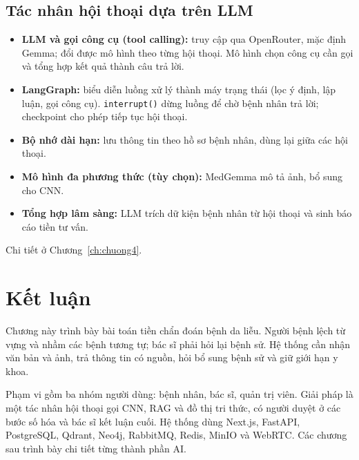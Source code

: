 \subsection{Tác nhân hội thoại dựa trên LLM}
\begin{itemize}
  \item \textbf{LLM và gọi công cụ (tool calling):} truy cập qua OpenRouter, mặc định Gemma; đổi được mô hình theo từng hội thoại. Mô hình chọn công cụ cần gọi và tổng hợp kết quả thành câu trả lời.
  \item \textbf{LangGraph:} biểu diễn luồng xử lý thành máy trạng thái (lọc ý định, lập luận, gọi công cụ). \texttt{interrupt()} dừng luồng để chờ bệnh nhân trả lời; checkpoint cho phép tiếp tục hội thoại.
  \item \textbf{Bộ nhớ dài hạn:} lưu thông tin theo hồ sơ bệnh nhân, dùng lại giữa các hội thoại.
  \item \textbf{Mô hình đa phương thức (tùy chọn):} MedGemma mô tả ảnh, bổ sung cho CNN.
  \item \textbf{Tổng hợp lâm sàng:} LLM trích dữ kiện bệnh nhân từ hội thoại và sinh báo cáo tiền tư vấn.
\end{itemize}

Chi tiết ở Chương~\ref{ch:chuong4}.

\section{Kết luận}

Chương này trình bày bài toán tiền chẩn đoán bệnh da liễu. Người bệnh lệch từ vựng và nhầm các bệnh tương tự; bác sĩ phải hỏi lại bệnh sử. Hệ thống cần nhận văn bản và ảnh, trả thông tin có nguồn, hỏi bổ sung bệnh sử và giữ giới hạn y khoa.

Phạm vi gồm ba nhóm người dùng: bệnh nhân, bác sĩ, quản trị viên. Giải pháp là một tác nhân hội thoại gọi CNN, RAG và đồ thị tri thức, có người duyệt ở các bước số hóa và bác sĩ kết luận cuối. Hệ thống dùng Next.js, FastAPI, PostgreSQL, Qdrant, Neo4j, RabbitMQ, Redis, MinIO và WebRTC. Các chương sau trình bày chi tiết từng thành phần AI.
